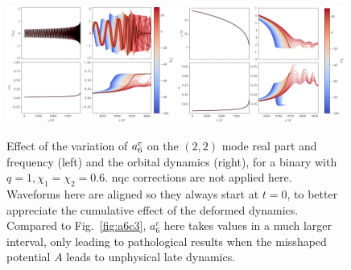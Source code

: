\documentclass[prd,amssymb,amsmath,amsfonts,nofootinbib,reprint,showpacs,longbibliography]{revtex4-1}
\begin{document}
\begin{figure}
    \includegraphics[width=0.49\textwidth]{figs/delta_a6c_-100.0_30.0.png}
    \includegraphics[width=0.49\textwidth]{figs/delta_a6c_-100.0_30.0_dyn.png}
    \caption{Effect of the variation of $a_6^{\rm c}$ on the $(2,2)$ mode real part and frequency (left) and the
    orbital dynamics (right), for a binary with $q = 1, \chi_1 = \chi_2 = 0.6$. \ac{nqc} corrections are not
    applied here.
    Waveforms here are aligned so they always start at $t = 0$, to better appreciate the cumulative effect of the
    deformed dynamics. Compared to Fig.~\ref{fig:a6c3}, $a_6^c$ here takes values in a much larger interval,
    only leading to pathological results when the misshaped potential $A$ leads to unphysical late dynamics.}
\end{figure}
\end{document}
